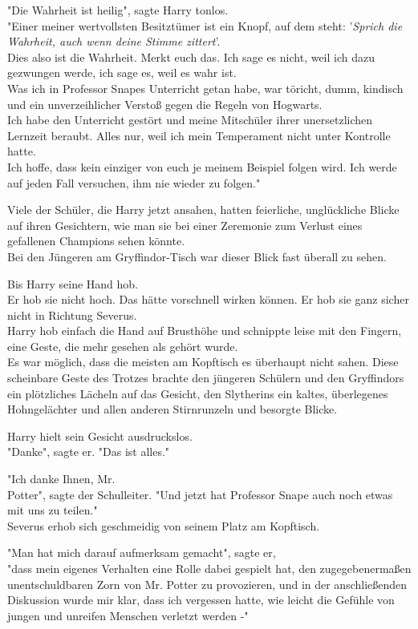 {"Die Wahrheit ist heilig", sagte Harry tonlos.\\ "Einer meiner wertvollsten Besitztümer ist ein Knopf, auf dem steht: '\emph{Sprich die Wahrheit, auch wenn deine Stimme zittert}'.\\ Dies also ist die Wahrheit. Merkt euch das. Ich sage es nicht, weil ich dazu gezwungen werde, ich sage es, weil es wahr ist.\\ Was ich in Professor Snapes Unterricht getan habe, war töricht, dumm, kindisch und ein unverzeihlicher Verstoß gegen die Regeln von Hogwarts.\\ Ich habe den Unterricht gestört und meine Mitschüler ihrer unersetzlichen Lernzeit beraubt. Alles nur, weil ich mein Temperament nicht unter Kontrolle hatte.\\ Ich hoffe, dass kein einziger von euch je meinem Beispiel folgen wird. Ich werde auf jeden Fall versuchen, ihm nie wieder zu folgen."

Viele der Schüler, die Harry jetzt ansahen, hatten feierliche, unglückliche Blicke auf ihren Gesichtern, wie man sie bei einer Zeremonie zum Verlust eines gefallenen Champions sehen könnte.\\ Bei den Jüngeren am Gryffindor-Tisch war dieser Blick fast überall zu sehen.

Bis Harry seine Hand hob.\\ Er hob sie nicht hoch. Das hätte vorschnell wirken können. Er hob sie ganz sicher nicht in Richtung Severus.\\ Harry hob einfach die Hand auf Brusthöhe und schnippte leise mit den Fingern, eine Geste, die mehr gesehen als gehört wurde.\\ Es war möglich, dass die meisten am Kopftisch es überhaupt nicht sahen. Diese scheinbare Geste des Trotzes brachte den jüngeren Schülern und den Gryffindors ein plötzliches Lächeln auf das Gesicht, den Slytherins ein kaltes, überlegenes Hohngelächter und allen anderen Stirnrunzeln und besorgte Blicke.

Harry hielt sein Gesicht ausdruckslos.\\ "Danke", sagte er. "Das ist alles."

"Ich danke Ihnen, Mr.\\ Potter", sagte der Schulleiter. "Und jetzt hat Professor Snape auch noch etwas mit uns zu teilen."\\ Severus erhob sich geschmeidig von seinem Platz am Kopftisch.

"Man hat mich darauf aufmerksam gemacht", sagte er,\\ "dass mein eigenes Verhalten eine Rolle dabei gespielt hat, den zugegebenermaßen unentschuldbaren Zorn von Mr. Potter zu provozieren, und in der anschließenden Diskussion wurde mir klar, dass ich vergessen hatte, wie leicht die Gefühle von jungen und unreifen Menschen verletzt werden -"

}
